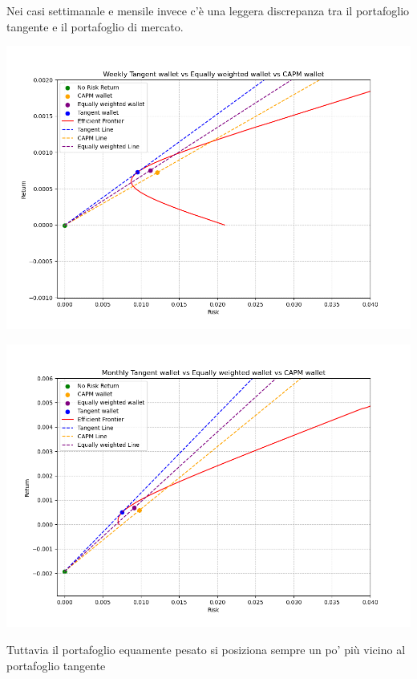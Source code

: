\documentclass[compress]{beamer}
\begin{document}
\begin{frame}{\subsecname}
	Nei casi settimanale e mensile invece c'è una leggera discrepanza tra il portafoglio tangente e il portafoglio di mercato. 
	\begin{center}
		\begin{minipage}{0.49\textwidth}
			\centering
			\includegraphics[width=1\linewidth]{images/Weekly Tangent wallet vs Equally weighted wallet vs CAPM wallet.png}
		\end{minipage}
		\begin{minipage}{0.49\textwidth}
			\centering
			\includegraphics[width=1\linewidth]{images/Monthly Tangent wallet vs Equally weighted wallet vs CAPM wallet.png}
		\end{minipage}
	\end{center}

	Tuttavia il portafoglio equamente pesato si posiziona sempre un po' più vicino al portafoglio tangente
\end{frame}
\end{document}
